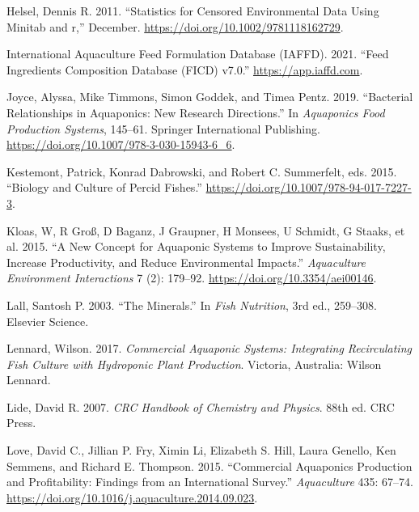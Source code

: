 \documentclass[preprint, 3p,
authoryear]{elsarticle} %
\newlength{\cslhangindent}
\newlength{\cslentryspacingunit} %
\newenvironment{CSLReferences}[2] %
 {%
  \setlength{\parindent}{0pt}
  \ifodd #1
  \let\oldpar\par
  \def\par{\hangindent=\cslhangindent\oldpar}
  \fi
  \setlength{\parskip}{#2\cslentryspacingunit}
 }%
 {}
\begin{document}
\begin{CSLReferences}{1}{0}
\leavevmode{}%
Helsel, Dennis R. 2011. {``Statistics for Censored Environmental Data
Using Minitab{\textregistered} and r,''} December.
\url{https://doi.org/10.1002/9781118162729}.

\leavevmode{}%
International Aquaculture Feed Formulation Database (IAFFD). 2021.
{``{Feed Ingredients Composition Database (FICD) v7.0}.''}
\url{https://app.iaffd.com}.

\leavevmode{}%
Joyce, Alyssa, Mike Timmons, Simon Goddek, and Timea Pentz. 2019.
{``{Bacterial Relationships in Aquaponics: New Research Directions}.''}
In \emph{Aquaponics Food Production Systems}, 145--61. Springer
International Publishing.
\url{https://doi.org/10.1007/978-3-030-15943-6_6}.

\leavevmode{}%
Kestemont, Patrick, Konrad Dabrowski, and Robert C. Summerfelt, eds.
2015. {``Biology and Culture of Percid Fishes.''}
\url{https://doi.org/10.1007/978-94-017-7227-3}.

\leavevmode{}%
Kloas, W, R Groß, D Baganz, J Graupner, H Monsees, U Schmidt, G Staaks,
et al. 2015. {``A New Concept for Aquaponic Systems to Improve
Sustainability, Increase Productivity, and Reduce Environmental
Impacts.''} \emph{Aquaculture Environment Interactions} 7 (2): 179--92.
\url{https://doi.org/10.3354/aei00146}.

\leavevmode{}%
Lall, Santosh P. 2003. {``{The Minerals}.''} In \emph{Fish Nutrition},
3rd ed., 259--308. Elsevier Science.

\leavevmode{}%
Lennard, Wilson. 2017. \emph{Commercial Aquaponic Systems: Integrating
Recirculating Fish Culture with Hydroponic Plant Production}. Victoria,
Australia: Wilson Lennard.

\leavevmode{}%
Lide, David R. 2007. \emph{{CRC Handbook of Chemistry and Physics}}.
88th ed. CRC Press.

\leavevmode{}%
Love, David C., Jillian P. Fry, Ximin Li, Elizabeth S. Hill, Laura
Genello, Ken Semmens, and Richard E. Thompson. 2015. {``Commercial
Aquaponics Production and Profitability: Findings from an International
Survey.''} \emph{Aquaculture} 435: 67--74.
\url{https://doi.org/10.1016/j.aquaculture.2014.09.023}.


\end{CSLReferences}
\end{document}
